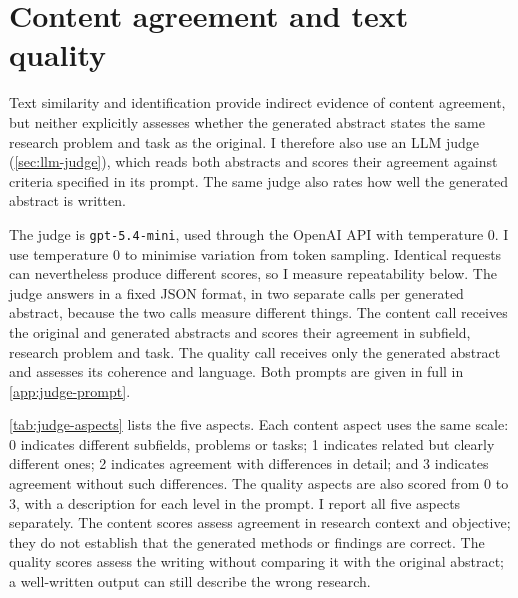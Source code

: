 \section{Content agreement and text quality}
\label{sec:judge-evaluation}

Text similarity and identification provide indirect evidence of content agreement, but neither explicitly assesses whether the generated abstract states the same research problem and task as the original. I therefore also use an LLM judge (\autoref{sec:llm-judge}), which reads both abstracts and scores their agreement against criteria specified in its prompt. The same judge also rates how well the generated abstract is written.

The judge is \texttt{gpt-5.4-mini}, used through the OpenAI API with temperature 0. I use temperature 0 to minimise variation from token sampling. Identical requests can nevertheless produce different scores, so I measure repeatability below. The judge answers in a fixed JSON format, in two separate calls per generated abstract, because the two calls measure different things. The content call receives the original and generated abstracts and scores their agreement in subfield, research problem and task. The quality call receives only the generated abstract and assesses its coherence and language. Both prompts are given in full in \autoref{app:judge-prompt}.

\autoref{tab:judge-aspects} lists the five aspects. Each content aspect uses the same scale: 0 indicates different subfields, problems or tasks; 1 indicates related but clearly different ones; 2 indicates agreement with differences in detail; and 3 indicates agreement without such differences. The quality aspects are also scored from 0 to 3, with a description for each level in the prompt. I report all five aspects separately. The content scores assess agreement in research context and objective; they do not establish that the generated methods or findings are correct. The quality scores assess the writing without comparing it with the original abstract; a well-written output can still describe the wrong research.

